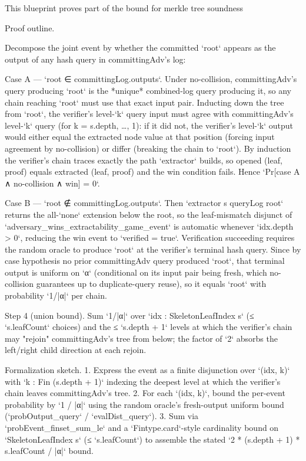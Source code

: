 This blueprint proves part of the bound for merkle tree soundness

Proof outline.

Decompose the joint event by whether the committed `root` appears as the
output of any hash query in committingAdv's log:

Case A — `root ∈ committingLog.outputs`.
  Under no-collision, committingAdv's query producing `root` is the *unique*
  combined-log query producing it, so any chain reaching `root` must use that
  exact input pair. Inducting down the tree from `root`, the verifier's level-`k`
  query input must agree with committingAdv's level-`k` query (for k = s.depth,
  …, 1): if it did not, the verifier's level-`k` output would either equal the
  extracted node value at that position (forcing input agreement by no-collision)
  or differ (breaking the chain to `root`). By induction the verifier's chain
  traces exactly the path `extractor` builds, so opened (leaf, proof) equals
  extracted (leaf, proof) and the win condition fails. Hence
  `Pr[case A ∧ no-collision ∧ win] = 0`.

Case B — `root ∉ committingLog.outputs`.
  Then `extractor s queryLog root` returns the all-`none` extension below the
  root, so the leaf-mismatch disjunct of `adversary_wins_extractability_game_event`
  is automatic whenever `idx.depth > 0`, reducing the win event to
  `verified = true`. Verification succeeding requires the random oracle to produce
  `root` at the verifier's terminal hash query. Since by case hypothesis no prior
  committingAdv query produced `root`, that terminal output is uniform on `α`
  (conditional on its input pair being fresh, which no-collision guarantees up to
  duplicate-query reuse), so it equals `root` with probability `1/|α|` per chain.

Step 4 (union bound).
  Sum `1/|α|` over `idx : SkeletonLeafIndex s` (≤ `s.leafCount` choices) and the
  ≤ `s.depth + 1` levels at which the verifier's chain may "rejoin" committingAdv's
  tree from below; the factor of `2` absorbs the left/right child direction at
  each rejoin.

Formalization sketch.
  1. Express the event as a finite disjunction over `(idx, k)` with
      `k : Fin (s.depth + 1)` indexing the deepest level at which the verifier's
      chain leaves committingAdv's tree.
  2. For each `(idx, k)`, bound the per-event probability by `1 / |α|` using the
      random oracle's fresh-output uniform bound (`probOutput_query` /
      `evalDist_query`).
  3. Sum via `probEvent_finset_sum_le` and a `Fintype.card`-style cardinality
      bound on `SkeletonLeafIndex s` (≤ `s.leafCount`) to assemble the stated
      `2 * (s.depth + 1) * s.leafCount / |α|` bound.